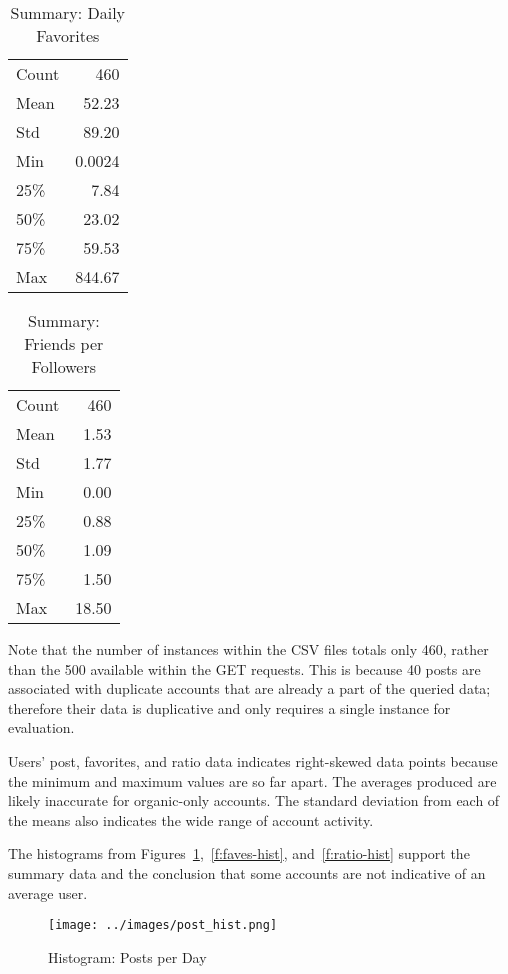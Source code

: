 \begin{table}[htb]
\centering
\caption{Summary: Daily Favorites}
\label{t:faves-summary}
\begin{tabular}{lr}
Count & 460  \\
Mean  & 52.23  \\
Std   & 89.20  \\
Min   & 0.0024 \\
25\%  & 7.84   \\
50\%  & 23.02  \\
75\%  & 59.53  \\
Max   & 844.67
\end{tabular}
\end{table}

\begin{table}[htb]
\centering
\caption{Summary: Friends per Followers}
\label{t:ratio-summary}
\begin{tabular}{lr}
Count & 460 \\
Mean  & 1.53   \\
Std   & 1.77   \\
Min   & 0.00   \\
25\%  & 0.88   \\
50\%  & 1.09   \\
75\%  & 1.50   \\
Max   & 18.50 
\end{tabular}
\end{table}

Note that the number of instances within the CSV files totals only 460, rather
than the 500 available within the GET requests. This is because 40 posts are
associated with duplicate accounts that are already a part of the queried data;
therefore their data is duplicative and only requires a single instance for
evaluation. 

Users' post, favorites, and ratio data indicates right-skewed data points
because the minimum and maximum values are so far apart. The averages produced
are likely inaccurate for organic-only accounts. The standard deviation from
each of the means also indicates the wide range of account activity.

The histograms from Figures~\ref{f:post-hist},~\ref{f:faves-hist},
and~\ref{f:ratio-hist} support the summary data and the conclusion that some
accounts are not indicative of an average user.

\begin{figure}[!ht]
  \centering\texttt{[image: ../images/post\_hist.png]}
  \caption{Histogram: Posts per Day}\label{f:post-hist}
\end{figure}

